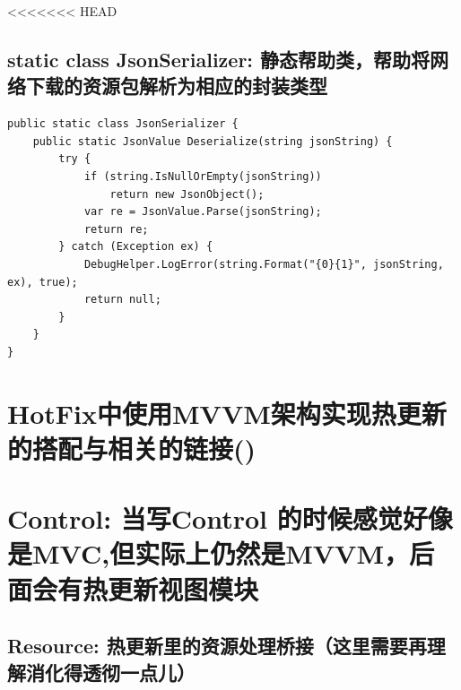 \documentclass[9pt, b5paper]{article}
\begin{document}
<<<<<<< HEAD
\subsection{static class JsonSerializer: 静态帮助类，帮助将网络下载的资源包解析为相应的封装类型}
\label{sec-7-2}
\begin{verbatim}
public static class JsonSerializer {
    public static JsonValue Deserialize(string jsonString) {
        try {
            if (string.IsNullOrEmpty(jsonString)) 
                return new JsonObject();
            var re = JsonValue.Parse(jsonString);
            return re;
        } catch (Exception ex) {
            DebugHelper.LogError(string.Format("{0}{1}", jsonString, ex), true);
            return null;
        }
    }
}
\end{verbatim}
\section{HotFix中使用MVVM架构实现热更新的搭配与相关的链接()}
\label{sec-8}

\section{Control: 当写Control 的时候感觉好像是MVC,但实际上仍然是MVVM，后面会有热更新视图模块}
\label{sec-9}
\subsection{Resource: 热更新里的资源处理桥接（这里需要再理解消化得透彻一点儿）}
\label{sec-9-1}
\end{document}
